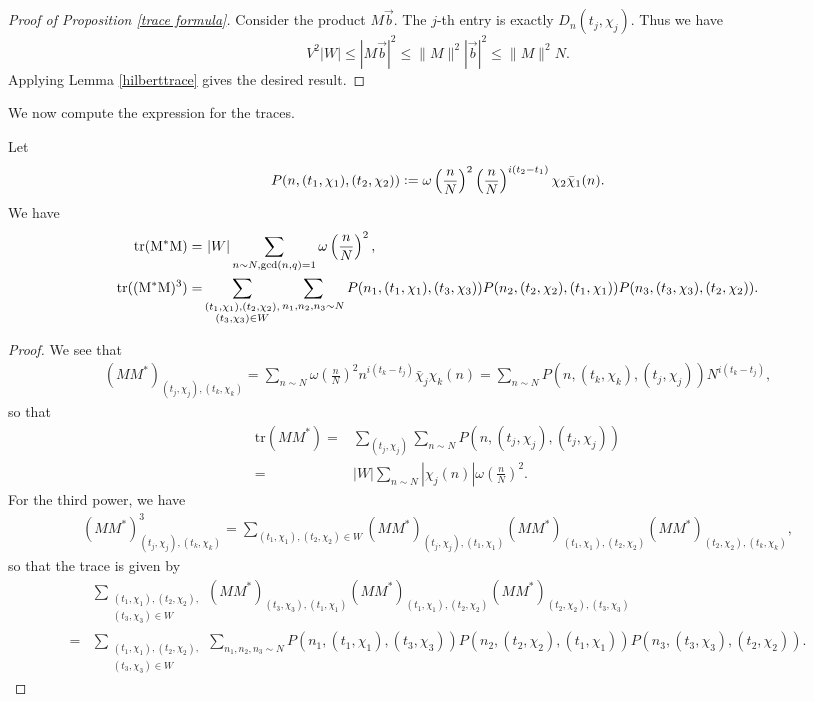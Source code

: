 \begin{proof}[Proof of Proposition \ref{trace formula}]
    Consider the product $M\vec{b}$. The $j$-th entry is exactly $D_n(t_j,\chi_j)$. Thus we have \[
    V^2|W|\leq |M \vec{b}|^2 \leq \|M\|^2|\vec{b}|^2\leq \|M\|^2N.
    \]
    Applying Lemma \ref{hilberttrace} gives the desired result.
\end{proof}


We now compute the expression for the traces.
\begin{lemma}
    Let \[
    P(n,(t_1,\chi_1),(t_2,\chi_2))\mathrel{\mathop:}= \omega\left(\frac{n}{N}\right)^2 \left(\frac{n}{N}\right)^{i(t_2-t_1)}\chi_2\bar{\chi}_1(n).
    \]
    We have 
    \begin{align*}
        \rm{tr}(M^*M) = & \ |W|\sum_{n\sim N, \gcd (n,q)=1} \omega\left(\frac{n}{N}\right)^2, \\
        \rm{tr}((M^*M)^3)=&\sum_{\substack{(t_1,\chi_1),(t_2,\chi_2),\\(t_3,\chi_3)\in W}}\sum_{n_1,n_2,n_3\sim N} 
        P(n_1,(t_1,\chi_1),(t_3,\chi_3))P(n_2,(t_2,\chi_2),(t_1,\chi_1))P(n_3,(t_3,\chi_3),(t_2,\chi_2)).
    \end{align*}
\end{lemma}
\begin{proof}
    We see that \begin{align*}
        (MM^*)_{(t_j,\chi_j),(t_k,\chi_k)} = \sum_{n\sim N} \omega\left(\frac{n}{N}\right)^2 n^{i(t_k-t_j)}\bar{\chi}_j\chi_k(n) = \sum_{n\sim N}P(n,(t_k,\chi_k),(t_j,\chi_j))N^{i(t_k-t_j)},
    \end{align*}
    so that \begin{align*}
        \textrm{tr}(MM^*) =& \sum_{(t_j,\chi_j)} \sum_{n\sim N} P(n,(t_j,\chi_j),(t_j,\chi_j)) \\
        =&|W|\sum_{n\sim N} |\chi_j(n)|\omega\left(\frac{n}{N}\right)^2.
    \end{align*}
    For the third power, we have 
    \begin{align*}
        (MM^*)^3_{(t_j,\chi_j),(t_k,\chi_k)} = \sum_{(t_1,\chi_1),(t_2,\chi_2)\in W}   (MM^*)_{(t_j,\chi_j),(t_1,\chi_1)} (MM^*)_{(t_1,\chi_1),(t_2,\chi_2)} (MM^*)_{(t_2,\chi_2),(t_k,\chi_k)},
    \end{align*}
    so that the trace is given by \begin{align*}
        &\sum_{\substack{(t_1,\chi_1),(t_2,\chi_2),\\(t_3,\chi_3)\in W}} (MM^*)_{(t_3,\chi_3),(t_1,\chi_1)} (MM^*)_{(t_1,\chi_1),(t_2,\chi_2)} (MM^*)_{(t_2,\chi_2),(t_3,\chi_3)}\\
        =&\sum_{\substack{(t_1,\chi_1),(t_2,\chi_2),\\(t_3,\chi_3)\in W}} \sum_{n_1,n_2,n_3\sim N} 
        P(n_1,(t_1,\chi_1),(t_3,\chi_3))P(n_2,(t_2,\chi_2),(t_1,\chi_1))P(n_3,(t_3,\chi_3),(t_2,\chi_2)).
    \end{align*}
\end{proof}

